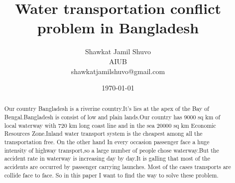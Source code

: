 \documentclass{article}
\begin{document}
\title{Water transportation conflict problem in Bangladesh }
\author{Shawkat Jamil Shuvo\\
AIUB\\
shawkatjamilshuvo@gmail.com\\}

\date{\today}
\maketitle
\begin{abstract}
  Our country Bangladesh is a riverine country.It's lies at the apex of the Bay of Bengal.Bangladesh is consist of low and plain lands.Our country has 9000 sq km of local waterway with 720 km long coast line and in the sea 20000 sq km Economic Resources Zone\cite{awal2007marine}.Inland water transport system is the cheapest among all the transportation free. On the other hand In every occasion passenger face a huge intensity of highway transport,so a large number of people chose waterway.But the accident rate in waterway is increasing day by day.It is galling that most of the accidents are occurred by passenger carrying launches\cite{awal2006study}. Most of the cases transports are collide face to face. So in this paper I want to find the way to solve these problem.

\end{abstract}
\tableofcontents
\end{document}
